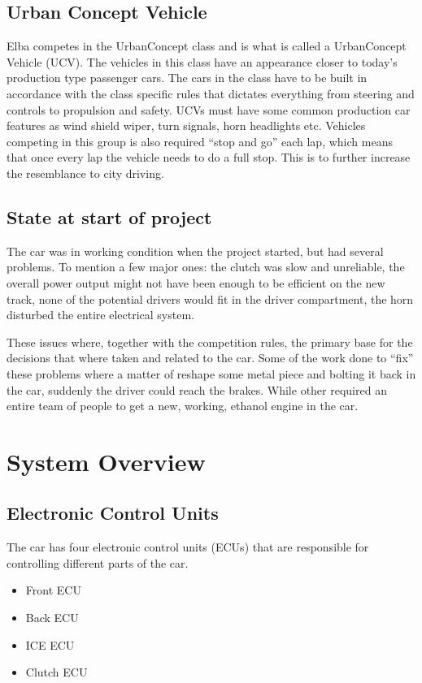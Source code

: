 \subsection{Urban Concept Vehicle}\label{UCV}
Elba competes in the UrbanConcept class and is what is called a UrbanConcept
Vehicle (UCV). The vehicles in this class have an appearance closer to today's
production type passenger cars. The cars in the class have to be built in
accordance with the class specific rules that dictates everything from steering
and controls to propulsion and safety. UCVs must have some common production
car features as wind shield wiper, turn signals, horn headlights etc. Vehicles
competing in this group is also required ``stop and go'' each lap, which means
that once every lap the vehicle needs to do a full stop. This is to further
increase the resemblance to city driving.

\subsection{State at start of project}
The car was in working condition when the project started, but had several
problems. To mention a few major ones: the clutch was slow and unreliable,
the overall power output might not have been enough to be efficient on the new
track, none of the potential drivers would fit in the driver compartment, the
horn disturbed the entire electrical system.

These issues where, together with the competition rules, the primary base for
the decisions that where taken and related to the car. Some of the work done to
``fix'' these problems where a matter of reshape some metal piece and bolting it
back in the car, suddenly the driver could reach the brakes. While other
required an entire team of people to get a new, working, ethanol engine in the
car.

\section{System Overview}
\subsection{Electronic Control Units}
The car has four electronic control units (ECUs) that are responsible for
controlling different parts of the car.

\begin{itemize}
\item Front ECU
\item Back ECU
\item ICE ECU
\item Clutch ECU
\end{itemize}

